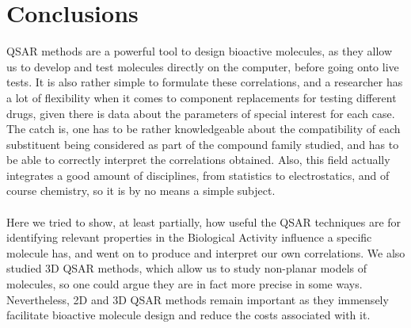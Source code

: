 \documentclass[a4paper, 12pt, notitlepage]{article}
\begin{document}
\section*{Conclusions}
QSAR methods are a powerful tool to design bioactive molecules, as they allow us to develop and test molecules directly on the computer, before going onto live tests. It is also rather simple to formulate these correlations, and a researcher has a lot of flexibility when it comes to component replacements for testing different drugs, given there is data about the parameters of special interest for each case. The catch is, one has to be rather knowledgeable about the compatibility of each substituent being considered as part of the compound family studied, and has to be able to correctly interpret the correlations obtained. Also, this field actually integrates a good amount of disciplines, from statistics to electrostatics, and of course chemistry, so it is by no means a simple subject.\\\\
Here we tried to show, at least partially, how useful the QSAR techniques are for identifying relevant properties in the Biological Activity influence a specific molecule has, and went on to produce and interpret our own correlations. We also studied 3D QSAR methods, which allow us to study non-planar models of molecules, so one could argue they are in fact more precise in some ways. Nevertheless, 2D and 3D QSAR methods remain important as they immensely facilitate bioactive molecule design and reduce the costs associated with it.
\end{document}
